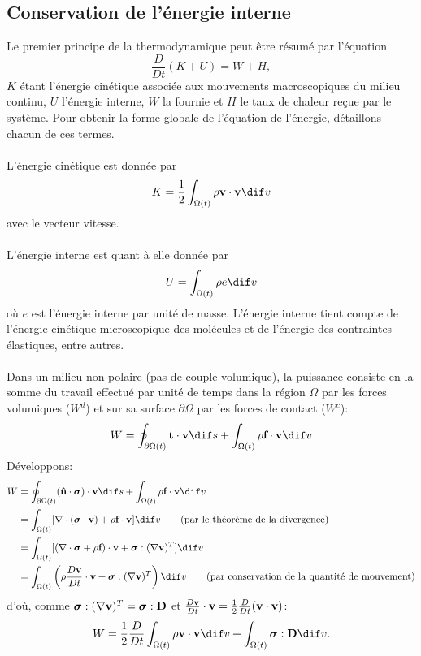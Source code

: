 \subsection{Conservation de l'énergie interne}
Le premier principe de la thermodynamique peut être résumé par l'équation \begin{equation}\label{eq:premier_principe}\frac{D}{Dt}(K+U)=W+H,\end{equation} $K$ étant l'énergie cinétique associée aux mouvements macroscopiques du milieu continu, $U$ l'énergie interne, $W$ la  fournie et $H$ le taux de chaleur reçue par le système. Pour obtenir la forme globale de l'équation de l'énergie, détaillons chacun de ces termes.
\paragraph{}
L'énergie cinétique est donnée par $$K=\frac{1}{2}\int_{\Omega (t)}\rho\fv{v}\cdot\fv{v} \dif v$$ avec  le vecteur vitesse.
\paragraph{}
L'énergie interne est quant à elle donnée par $$U=\int_{\Omega (t)}\rho e \dif v$$ où $e$ est l'énergie interne par unité de masse. L'énergie interne tient compte de l'énergie cinétique microscopique des molécules et de l'énergie des contraintes élastiques, entre autres.
\paragraph{}
Dans un milieu non-polaire (pas de couple volumique), la puissance consiste en la somme du travail effectué par unité de temps dans la région $\Omega$ par les forces volumiques ($W^d$) et sur sa surface $\partial \Omega$ par les forces de contact ($W^c$):
\begin{equation}\label{eq:travail}W=\oint_{\partial \Omega (t)}\fv{t}\cdot\fv{v} \dif s+\int_{\Omega (t)}\rho\fv{f}\cdot\fv{v} \dif v\end{equation}
Développons:
$$\begin{aligned}
W&=\oint_{\partial \Omega (t)}(\fv{\^n}\cdot\boldsymbol{\sigma})\cdot\fv{v} \dif s+\int_{\Omega (t)}\rho\fv{f}\cdot\fv{v} \dif v\\
 &=\int_{\Omega (t)}[\nabla\cdot(\boldsymbol{\sigma}\cdot\fv{v})+\rho\fv{f}\cdot\fv{v}] \dif v\qquad\text{(par le théorème de la divergence)}\\
 &=\int_{\Omega (t)}[(\nabla\cdot\boldsymbol{\sigma}+\rho\fv{f})\cdot\fv{v}+\boldsymbol{\sigma}:(\nabla\fv{v})^T] \dif v\\
 &=\int_{\Omega (t)}\left(\rho\frac{D\fv{v}}{Dt}\cdot\fv{v}+\boldsymbol{\sigma}:(\nabla\fv{v})^T\right) \dif v\qquad\text{(par conservation de la quantité de mouvement)}\\
\end{aligned}$$
d'où, comme $\boldsymbol{\sigma}:(\nabla\textbf{v})^T=\boldsymbol{\sigma}:\textbf{D}$ et $\frac{D\textbf{v}}{Dt}\cdot\textbf{v}=\frac{1}{2}\frac{D}{Dt}(\textbf{v}\cdot\textbf{v})$:
\begin{equation}\label{eq:travail2}W=\frac{1}{2}\frac{D}{Dt}\int_{\Omega (t)}\rho\fv{v}\cdot\fv{v} \dif v+\int_{\Omega(t)}\boldsymbol{\sigma}:\fv{D} \dif v.\end{equation}
